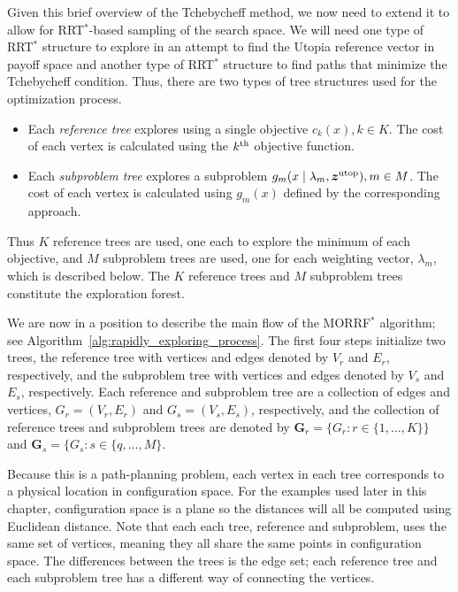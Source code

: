 \documentclass{article}
\begin{document}
Given this brief overview of the Tchebycheff method, we now need to extend it to allow for RRT$^{*}$-based sampling of the search space.  
We will need one type of RRT$^{*}$ structure to explore in an attempt to find the Utopia reference vector in payoff space and another type of RRT$^{*}$ structure to find paths that minimize the Tchebycheff condition.  
Thus, there are two types of tree structures used for the optimization process.
\begin{itemize}
\item Each \emph{reference tree} explores using a single objective $ c_{k} (x), k \in K $. 
The cost of each vertex is calculated using the $ k^{\rm th} $ objective function.
\item Each \emph{subproblem tree} explores a subproblem $ g_{m} ( x \mid \lambda_{m} , \bm{z}^{\rm utop} ) , m \in M $.
The cost of each vertex is calculated using $ g_{m}(x) $ defined by the corresponding approach.
\end{itemize}
Thus $ K $ reference trees are used, one each to explore the minimum of each objective, and $ M $ subproblem trees are used, one for each weighting vector, $ \lambda_{m} $, which is described below.  
The $K$ reference trees and $M$ subproblem trees constitute the exploration forest.

We are now in a position to describe the main flow of the MORRF$^{*}$ algorithm; see Algorithm~\ref{alg:rapidly_exploring_process}.  
The first four steps initialize two trees, the reference tree with vertices and edges denoted by $V_r$ and $E_r$, respectively, and the subproblem tree with vertices and edges denoted by $V_s$ and $E_s$, respectively.  
Each reference and subproblem tree are a collection of edges and vertices, $G_r=(V_r,E_r)$ and $G_s=(V_s,E_s)$, respectively, and the collection of reference trees and subproblem trees are denoted by ${\mathbf G}_r = \{G_r: r\in \{1, \ldots, K\}\}$ and ${\mathbf G}_s = \{G_s: s \in \{q, \ldots, M\}$.  

Because this is a path-planning problem, each vertex in each tree corresponds to a physical location in configuration space.  
For the examples used later in this chapter, configuration space is a plane so the distances will all be computed using Euclidean distance. 
Note that each each tree, reference and subproblem, uses the same set of vertices, meaning they all share the same points in configuration space.  
The differences between the trees is the edge set; each reference tree and each subproblem tree has a different way of connecting the vertices.
\end{document}
